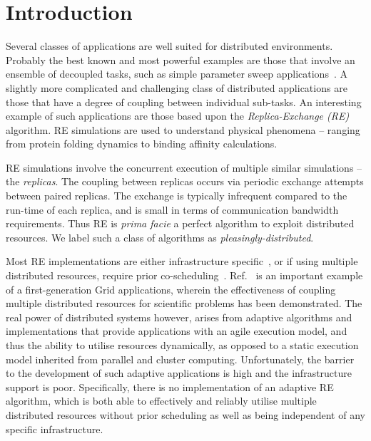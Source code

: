 \documentclass{rspublic}
\begin{document}
\section{Introduction}

Several classes of applications are well suited for distributed
environments. Probably the best known and most powerful examples are
those that involve an ensemble of decoupled tasks, such as simple
parameter sweep applications~\citep{1239909}.  A slightly more
complicated and challenging class of distributed applications are
those that have a degree of coupling between individual sub-tasks.  An
interesting example of such applications are those based upon the
\emph{Replica-Exchange (RE)}~\citep{hansmann,Sugita:1999rm} algorithm.
RE simulations are used to understand physical phenomena -- ranging
from protein folding dynamics to binding affinity calculations.

RE simulations involve the concurrent execution of multiple similar
simulations -- the \emph{replicas}. The coupling between replicas
occurs via periodic exchange attempts between paired replicas. The
exchange is typically infrequent compared to the run-time of each
replica, and is small in terms of communication bandwidth
requirements. Thus RE is {\it prima facie} a perfect algorithm to
exploit distributed resources. We label such a class of algorithms as
{\it pleasingly-distributed}.

Most RE implementations are either infrastructure
specific~\citep{Woods:2005nx}, or if using multiple distributed
resources, require prior co-scheduling~\citep{repex_mpig}.
Ref.~\citep{repex_mpig} is an important example of a first-generation
Grid applications, wherein the effectiveness of coupling multiple
distributed resources for scientific problems has been demonstrated.
The real power of distributed systems however, arises from adaptive
algorithms and implementations that provide applications with an agile
execution model, and thus the ability to utilise resources
dynamically, as opposed to a static execution model inherited from
parallel and cluster computing.  Unfortunately, the barrier to the
development of such adaptive applications is high and the
infrastructure support is poor.
Specifically, there is no implementation of an
adaptive RE algorithm, which is both able to effectively and reliably
utilise multiple distributed resources without prior scheduling as
well as being independent of any specific %
infrastructure.
                      
\end{document}
